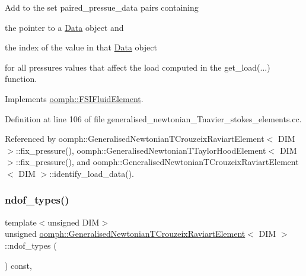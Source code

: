Add to the set {\ttfamily paired\+\_\+pressue\+\_\+data} pairs containing
\begin{DoxyItemize}
\item the pointer to a \hyperlink{classoomph_1_1Data}{Data} object and
\item the index of the value in that \hyperlink{classoomph_1_1Data}{Data} object
\end{DoxyItemize}for all pressures values that affect the load computed in the {\ttfamily get\+\_\+load}(...) function. 

Implements \hyperlink{classoomph_1_1FSIFluidElement_af8e0805b769b7d111eb71f223fc83df8}{oomph\+::\+F\+S\+I\+Fluid\+Element}.



Definition at line 106 of file generalised\+\_\+newtonian\+\_\+\+Tnavier\+\_\+stokes\+\_\+elements.\+cc.



Referenced by oomph\+::\+Generalised\+Newtonian\+T\+Crouzeix\+Raviart\+Element$<$ D\+I\+M $>$\+::fix\+\_\+pressure(), oomph\+::\+Generalised\+Newtonian\+T\+Taylor\+Hood\+Element$<$ D\+I\+M $>$\+::fix\+\_\+pressure(), and oomph\+::\+Generalised\+Newtonian\+T\+Crouzeix\+Raviart\+Element$<$ D\+I\+M $>$\+::identify\+\_\+load\+\_\+data().

\mbox{\label{classoomph_1_1GeneralisedNewtonianTCrouzeixRaviartElement_a9c235f3983f798316a76bb0a40757f56}} 
\subsubsection{\texorpdfstring{ndof\+\_\+types()}{ndof\_types()}}
{\footnotesize\ttfamily template$<$unsigned D\+IM$>$ \\
unsigned \hyperlink{classoomph_1_1GeneralisedNewtonianTCrouzeixRaviartElement}{oomph\+::\+Generalised\+Newtonian\+T\+Crouzeix\+Raviart\+Element}$<$ D\+IM $>$\+::ndof\+\_\+types (\begin{DoxyParamCaption}{ }\end{DoxyParamCaption}) const\hspace{0.3cm}{\ttfamily [inline]}, {\ttfamily [virtual]}}



